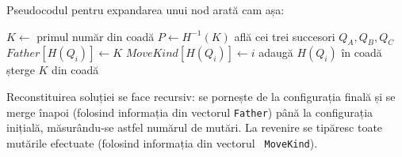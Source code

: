 Pseudocodul pentru expandarea unui nod arată cam așa:

\vspace{\algskip}
\begin{algorithmic}[1]
  \STATE $K \leftarrow$ primul număr din coadă
  \STATE $P \leftarrow H^{-1}(K)$
  \STATE află cei trei succesori $Q_A, Q_B, Q_C$
  \STATE $Father[H(Q_i)] \leftarrow K$
  \STATE $MoveKind[H(Q_i)] \leftarrow i$
  \STATE adaugă $H(Q_i)$ în coadă
  \ENDIF
  \ENDFOR
  \STATE șterge $K$ din coadă
\end{algorithmic}

Reconstituirea soluției se face recursiv: se pornește de la configurația
finală și se merge înapoi (folosind informația din vectorul {\tt Father}) până
la configurația inițială, măsurându-se astfel numărul de mutări. La revenire
se tipăresc toate mutările efectuate (folosind informația din vectorul {\tt
  MoveKind}).

\inputminted{c}{src/problem3-2.c}
